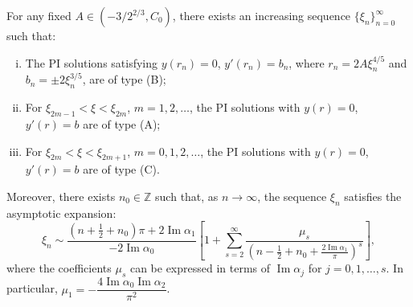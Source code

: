 \documentclass[12pt]{article}
\theoremstyle{plain}
\newtheorem{corollary}{\hskip\parindent Corollary}
\theoremstyle{definition}
\numberwithin{equation}{section}
\renewcommand\Im{\operatorname{Im}}
\begin{document}
\begin{corollary}\label{cor-classification-1}
For any fixed \( A \in (-3/2^{2/3}, C_{0}) \), there exists an increasing sequence \( \{\xi_{n}\}_{n=0}^\infty \) such that:
\begin{enumerate}[(i)]
\item The PI solutions satisfying \( y(r_n) = 0 \), \( y'(r_n) = b_n \), where \( r_n = 2A\xi_n^{4/5} \) and \( b_n = \pm 2\xi_n^{3/5} \), are of type (B);
\item For \( \xi_{2m-1} < \xi < \xi_{2m} \), \( m = 1, 2, \ldots \), the PI solutions with \( y(r) = 0 \), \( y'(r) = b \) are of type (A);
\item For \( \xi_{2m} < \xi < \xi_{2m+1} \), \( m = 0, 1, 2, \ldots \), the PI solutions with \( y(r) = 0 \), \( y'(r) = b \) are of type (C).
\end{enumerate}

Moreover, there exists \( n_{0} \in \mathbb{Z} \) such that, as \( n \to \infty \), the sequence \( \xi_{n} \) satisfies the asymptotic expansion:
\begin{equation}\label{eq-asym-xi-n}
\xi_{n} \sim \frac{\left(n + \frac{1}{2} + n_{0}\right)\pi + 2\Im \alpha_{1}}{-2\Im \alpha_{0}} \left[ 1 + \sum_{s=2}^{\infty} \frac{\mu_{s}}{\left(n - \frac{1}{2} + n_{0} + \frac{2\Im \alpha_{1}}{\pi} \right)^{s}} \right],
\end{equation}
where the coefficients \( \mu_{s} \) can be expressed in terms of \( \Im \alpha_{j} \) for \( j = 0, 1, \ldots, s \). In particular, \( \mu_{1} = -\dfrac{4\Im \alpha_{0} \Im \alpha_{2}}{\pi^{2}} \).
\end{corollary}
\end{document}
